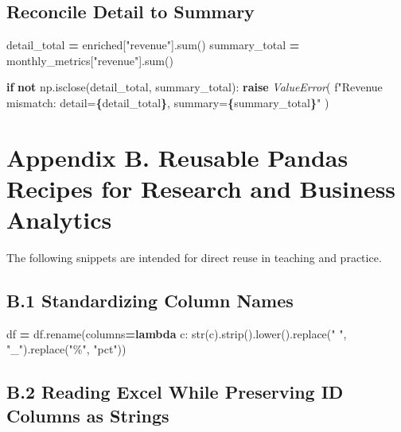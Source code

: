 \documentclass[
  12pt,
]{article}
\newenvironment{Shaded}{\begin{snugshade}}{\end{snugshade}}
\newcommand{\BuiltInTok}[1]{#1}
\newcommand{\ControlFlowTok}[1]{\textcolor[rgb]{0.13,0.29,0.53}{\textbf{#1}}}
\newcommand{\KeywordTok}[1]{\textcolor[rgb]{0.13,0.29,0.53}{\textbf{#1}}}
\newcommand{\NormalTok}[1]{#1}
\newcommand{\OperatorTok}[1]{\textcolor[rgb]{0.81,0.36,0.00}{\textbf{#1}}}
\newcommand{\PreprocessorTok}[1]{\textcolor[rgb]{0.56,0.35,0.01}{\textit{#1}}}
\newcommand{\SpecialCharTok}[1]{\textcolor[rgb]{0.81,0.36,0.00}{\textbf{#1}}}
\newcommand{\SpecialStringTok}[1]{\textcolor[rgb]{0.31,0.60,0.02}{#1}}
\newcommand{\StringTok}[1]{\textcolor[rgb]{0.31,0.60,0.02}{#1}}
\begin{document}
\subsection{Reconcile Detail to
Summary}\label{reconcile-detail-to-summary}

\begin{Shaded}
\begin{Highlighting}[]
\NormalTok{detail\_total }\OperatorTok{=}\NormalTok{ enriched[}\StringTok{"revenue"}\NormalTok{].}\BuiltInTok{sum}\NormalTok{()}
\NormalTok{summary\_total }\OperatorTok{=}\NormalTok{ monthly\_metrics[}\StringTok{"revenue"}\NormalTok{].}\BuiltInTok{sum}\NormalTok{()}

\ControlFlowTok{if} \KeywordTok{not}\NormalTok{ np.isclose(detail\_total, summary\_total):}
    \ControlFlowTok{raise} \PreprocessorTok{ValueError}\NormalTok{(}
        \SpecialStringTok{f"Revenue mismatch: detail=}\SpecialCharTok{\{}\NormalTok{detail\_total}\SpecialCharTok{\}}\SpecialStringTok{, summary=}\SpecialCharTok{\{}\NormalTok{summary\_total}\SpecialCharTok{\}}\SpecialStringTok{"}
\NormalTok{    )}
\end{Highlighting}
\end{Shaded}

\section{Appendix B. Reusable Pandas Recipes for Research and Business
Analytics}\label{appendix-b.-reusable-pandas-recipes-for-research-and-business-analytics}

The following snippets are intended for direct reuse in teaching and
practice.

\subsection{B.1 Standardizing Column
Names}\label{b.1-standardizing-column-names}

\begin{Shaded}
\begin{Highlighting}[]
\NormalTok{df }\OperatorTok{=}\NormalTok{ df.rename(columns}\OperatorTok{=}\KeywordTok{lambda}\NormalTok{ c: }\BuiltInTok{str}\NormalTok{(c).strip().lower().replace(}\StringTok{" "}\NormalTok{, }\StringTok{"\_"}\NormalTok{).replace(}\StringTok{"\%"}\NormalTok{, }\StringTok{"pct"}\NormalTok{))}
\end{Highlighting}
\end{Shaded}

\subsection{B.2 Reading Excel While Preserving ID Columns as
Strings}\label{b.2-reading-excel-while-preserving-id-columns-as-strings}
\end{document}
